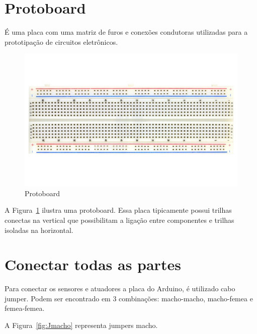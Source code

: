 \section{Protoboard}

É uma placa com uma matriz de furos e conexões condutoras utilizadas para a prototipação de circuitos eletrônicos.

\begin{figure}[ht]
      \centering
      \includegraphics[scale=0.50]{figuras/FProtoboard_2_M.jpg}
      \caption{Protoboard}
      \label{fig:protoboard}
\end{figure}

A Figura~\ref{fig:protoboard} ilustra uma protoboard. Essa placa tipicamente possui trilhas conectas na vertical que possibilitam a ligação entre componentes e trilhas isoladas na horizontal. 

\section{Conectar todas as partes}

Para conectar os sensores e atuadores a placa do Arduino, é utilizado cabo jumper. Podem ser encontrado em 3 combinações: macho-macho, macho-femea e femea-femea.

A Figura~\ref{fig:Jmacho} representa jumpers macho. 

